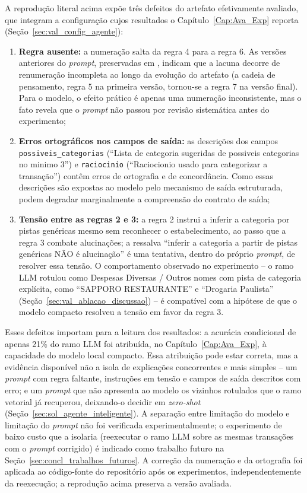 \begin{apendicesenv}
A reprodução literal acima expõe três defeitos do artefato efetivamente avaliado, que integram a configuração cujos resultados o Capítulo~\ref{Cap:Ava_Exp} reporta (Seção~\ref{sec:val_config_agente}):
\begin{enumerate}
	\item \textbf{Regra ausente:} a numeração salta da regra 4 para a regra 6. As versões anteriores do \textit{prompt}, preservadas em , indicam que a lacuna decorre de renumeração incompleta ao longo da evolução do artefato (a cadeia de pensamento, regra 5 na primeira versão, tornou-se a regra 7 na versão final). Para o modelo, o efeito prático é apenas uma numeração inconsistente, mas o fato revela que o \textit{prompt} não passou por revisão sistemática antes do experimento;
	\item \textbf{Erros ortográficos nos campos de saída:} as descrições dos campos \texttt{possiveis\_categorias} (``Lista de categoria sugeridas de possiveis categorias no minimo 3'') e \texttt{raciocinio} (``Raciocionio usado para categorizar a transação'') contêm erros de ortografia e de concordância. Como essas descrições são expostas ao modelo pelo mecanismo de saída estruturada, podem degradar marginalmente a compreensão do contrato de saída;
	\item \textbf{Tensão entre as regras 2 e 3:} a regra 2 instrui a inferir a categoria por pistas genéricas mesmo sem reconhecer o estabelecimento, ao passo que a regra 3 combate alucinações; a ressalva ``inferir a categoria a partir de pistas genéricas NÃO é alucinação'' é uma tentativa, dentro do próprio \textit{prompt}, de resolver essa tensão. O comportamento observado no experimento -- o ramo LLM rotulou como Despesas Diversas / Outros nomes com pista de categoria explícita, como ``SAPPORO RESTAURANTE'' e ``Drogaria Paulista'' (Seção~\ref{sec:val_ablacao_discussao}) -- é compatível com a hipótese de que o modelo compacto resolveu a tensão em favor da regra 3.
\end{enumerate}

Esses defeitos importam para a leitura dos resultados: a acurácia condicional de apenas 21\% do ramo LLM foi atribuída, no Capítulo~\ref{Cap:Ava_Exp}, à capacidade do modelo local compacto. Essa atribuição pode estar correta, mas a evidência disponível não a isola de explicações concorrentes e mais simples -- um \textit{prompt} com regra faltante, instruções em tensão e campos de saída descritos com erro; e um \textit{prompt} que não apresenta ao modelo os vizinhos rotulados que o ramo vetorial já recuperou, deixando-o decidir em \textit{zero-shot} (Seção~\ref{sec:sol_agente_inteligente}). A separação entre limitação do modelo e limitação do \textit{prompt} não foi verificada experimentalmente; o experimento de baixo custo que a isolaria (reexecutar o ramo LLM sobre as mesmas transações com o \textit{prompt} corrigido) é indicado como trabalho futuro na Seção~\ref{sec:concl_trabalhos_futuros}. A correção da numeração e da ortografia foi aplicada ao código-fonte do repositório após os experimentos, independentemente da reexecução; a reprodução acima preserva a versão avaliada.


\end{apendicesenv}
